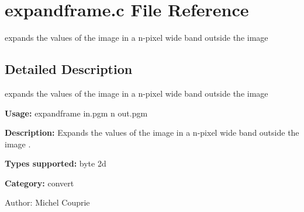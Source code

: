 \section{expandframe.c File Reference}
\label{expandframe_8c}
expands the values of the image in a n-pixel wide band outside the image  




\label{_details}
\subsection{Detailed Description}
expands the values of the image in a n-pixel wide band outside the image 

{\bf Usage:} expandframe in.pgm n out.pgm

{\bf Description:} Expands the values of the image in a n-pixel wide band outside the image .

{\bf Types supported:} byte 2d

{\bf Category:} convert

\begin{Desc}
\item[Author:]Michel Couprie \end{Desc}
